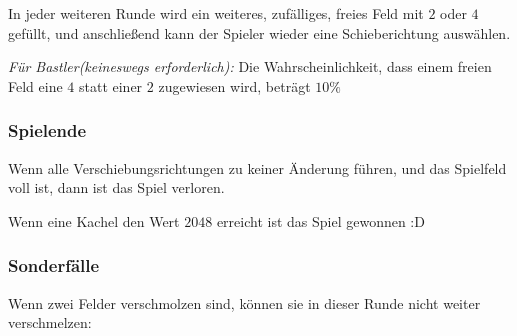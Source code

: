 \begin{minipage}[t]{.3\textwidth}%
    \centering%
    \captionsetup{type=figure}
\end{minipage}%

In jeder weiteren Runde wird ein weiteres, zufälliges, freies Feld mit $2$ oder $4$ gefüllt, und anschließend kann der Spieler wieder eine Schieberichtung auswählen.

\textit{Für Bastler(keineswegs erforderlich):} Die Wahrscheinlichkeit, dass einem freien Feld eine $4$ statt einer $2$ zugewiesen wird, beträgt $10\%$
\vspace{-1ex}
\subsubsection*{Spielende}
Wenn alle Verschiebungsrichtungen zu keiner Änderung führen, und das Spielfeld voll ist, dann ist das Spiel verloren.

Wenn eine Kachel den Wert $2048$ erreicht ist das Spiel gewonnen :D
\vspace{-1ex}
\subsubsection*{Sonderfälle}

Wenn zwei Felder verschmolzen sind, können sie in dieser Runde nicht weiter verschmelzen:

